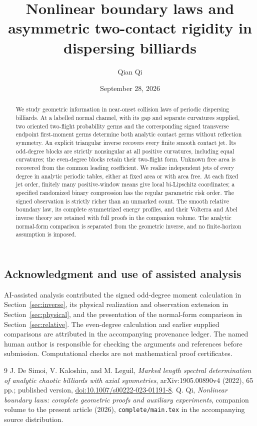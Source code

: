 \documentclass[11pt]{amsart}
\title[Boundary laws and asymmetric contact rigidity]{Nonlinear boundary laws and asymmetric two-contact rigidity
in dispersing billiards}
\author{Qian Qi}
\date{September 28, 2026}
\theoremstyle{definition}\newtheorem{definition}[theorem]{Definition}
\theoremstyle{remark}\newtheorem{remark}[theorem]{Remark}
\numberwithin{equation}{section}
\begin{document}
\begin{abstract}
We study geometric information in near-onset collision laws of periodic
dispersing billiards. At a labelled normal channel, with its gap and separate
curvatures supplied, two oriented two-flight probability germs and the
corresponding signed transverse endpoint first-moment germs determine both
analytic contact germs without reflection symmetry. An explicit triangular
inverse recovers every finite smooth contact jet. Its odd-degree blocks are
strictly nonsingular at all positive curvatures, including equal curvatures;
the even-degree blocks retain their two-flight form. Unknown free area is
recovered from the common leading coefficient. We realize independent jets
of every degree in analytic periodic tables, either at fixed area or with
area free. At each fixed jet order, finitely many positive-window means give
local bi-Lipschitz coordinates; a specified randomized binary compression
has the regular parametric risk order. The signed observation is strictly
richer than an unmarked count. The smooth relative boundary law, its complete
symmetrized energy profiles, and their Volterra and Abel inverse theory are
retained with full proofs in the companion volume. The analytic normal-form
comparison is separated from the geometric inverse, and no finite-horizon
assumption is imposed.
\end{abstract}
\maketitle





\subsection*{Acknowledgment and use of assisted analysis}
AI-assisted analysis contributed the signed odd-degree moment calculation
in Section~\ref{sec:inverse}, its physical realization and observation
extension in Section~\ref{sec:physical}, and the presentation of the
normal-form comparison in Section~\ref{sec:relative}. The even-degree
calculation and earlier supplied comparisons are attributed in the
accompanying provenance ledger. The named human author is responsible for
checking the arguments and references before submission. Computational
checks are not mathematical proof certificates.
\begin{thebibliography}{9}
J. De Simoi, V. Kaloshin, and M. Leguil,
\emph{Marked length spectral determination of analytic chaotic billiards
with axial symmetries}, arXiv:1905.00890v4 (2022), 65 pp.;
published version, \href{https://doi.org/10.1007/s00222-023-01191-8}{doi:10.1007/s00222-023-01191-8}.
Q. Qi, \emph{Nonlinear boundary laws: complete geometric proofs and
auxiliary experiments}, companion volume to the present article (2026),
\texttt{complete/main.tex} in the accompanying source distribution.
\end{thebibliography}
\end{document}
